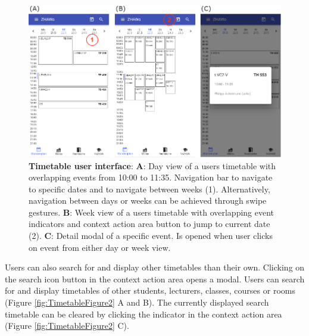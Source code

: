 \begin{markdown}
\begin{figure}[H]
  \includegraphics[width=16cm, center]{./figures/timetable_figure1.png}
  \captionsetup{width=15.5cm}
  \caption[Timetable user interface]{\textbf{Timetable user interface}: \textbf{A}: Day view of a users timetable with overlapping events from 10:00 to 11:35. Navigation bar to navigate to specific dates and to navigate between weeks (1). Alternatively, navigation between days or weeks can be achieved through swipe gestures. \textbf{B}: Week view of a users timetable with overlapping event indicators and context action area button to jump to current date (2). \textbf{C}: Detail modal of a specific event. Is opened when user clicks on event from either day or week view.}
  \label{fig:TimetableFigure1}
\end{figure}

\newpage

Users can also search for and display other timetables than their own. Clicking on the search icon button in the context action area opens a modal. Users can search for and display timetables of other students, lecturers, classes, courses or rooms (Figure \ref{fig:TimetableFigure2} A and B). The currently displayed search timetable can be cleared by clicking the indicator in the context action area (Figure \ref{fig:TimetableFigure2} C).

\bigskip


\end{markdown}
